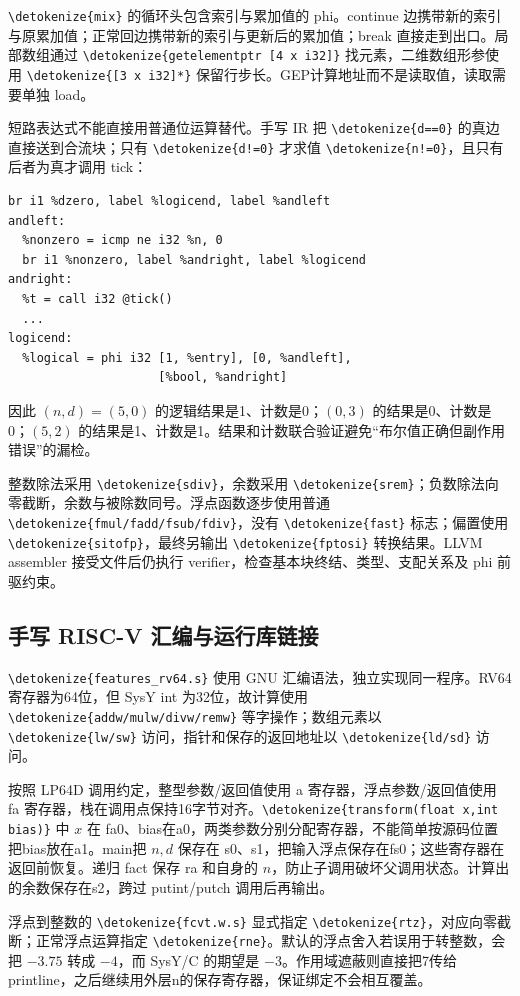 \documentclass[UTF8,a4paper,10pt,fontset=none]{ctexart}
\newcommand{\code}[1]{{\small\expandafter\nolinkurl\expandafter{\detokenize{#1}}}}
\begin{document}
\code{mix} 的循环头包含索引与累加值的 phi。continue 边携带新的索引与原累加值；正常回边携带新的索引与更新后的累加值；break 直接走到出口。局部数组通过 \code{getelementptr [4 x i32]} 找元素，二维数组形参使用 \code{[3 x i32]*} 保留行步长。GEP计算地址而不是读取值，读取需要单独 load。

短路表达式不能直接用普通位运算替代。手写 IR 把 \code{d==0} 的真边直接送到合流块；只有 \code{d!=0} 才求值 \code{n!=0}，且只有后者为真才调用 tick：
\begin{lstlisting}[numbers=none]
%dzero = icmp eq i32 %d, 0
br i1 %dzero, label %logicend, label %andleft
andleft:
  %nonzero = icmp ne i32 %n, 0
  br i1 %nonzero, label %andright, label %logicend
andright:
  %t = call i32 @tick()
  ...
logicend:
  %logical = phi i32 [1, %entry], [0, %andleft],
                     [%bool, %andright]
\end{lstlisting}
因此 $(n,d)=(5,0)$ 的逻辑结果是1、计数是0；$(0,3)$ 的结果是0、计数是0；$(5,2)$ 的结果是1、计数是1。结果和计数联合验证避免“布尔值正确但副作用错误”的漏检。

整数除法采用 \code{sdiv}，余数采用 \code{srem}；负数除法向零截断，余数与被除数同号。浮点函数逐步使用普通 \code{fmul/fadd/fsub/fdiv}，没有 \code{fast} 标志；偏置使用 \code{sitofp}，最终另输出 \code{fptosi} 转换结果。LLVM assembler 接受文件后仍执行 verifier，检查基本块终结、类型、支配关系及 phi 前驱约束。

\subsection{手写 RISC-V 汇编与运行库链接}
\code{features_rv64.s} 使用 GNU 汇编语法，独立实现同一程序。RV64寄存器为64位，但 SysY int 为32位，故计算使用 \code{addw/mulw/divw/remw} 等字操作；数组元素以 \code{lw/sw} 访问，指针和保存的返回地址以 \code{ld/sd} 访问。

按照 LP64D 调用约定，整型参数/返回值使用 a 寄存器，浮点参数/返回值使用 fa 寄存器，栈在调用点保持16字节对齐\cite{psabi}。\code{transform(float x,int bias)} 中 $x$ 在 fa0、bias在a0，两类参数分别分配寄存器，不能简单按源码位置把bias放在a1。main把 $n,d$ 保存在 s0、s1，把输入浮点保存在fs0；这些寄存器在返回前恢复。递归 fact 保存 ra 和自身的 $n$，防止子调用破坏父调用状态。计算出的余数保存在s2，跨过 putint/putch 调用后再输出。

浮点到整数的 \code{fcvt.w.s} 显式指定 \code{rtz}，对应向零截断；正常浮点运算指定 \code{rne}。默认的浮点舍入若误用于转整数，会把 $-3.75$ 转成 $-4$，而 SysY/C 的期望是 $-3$。作用域遮蔽则直接把7传给 printline，之后继续用外层n的保存寄存器，保证绑定不会相互覆盖。
\end{document}
